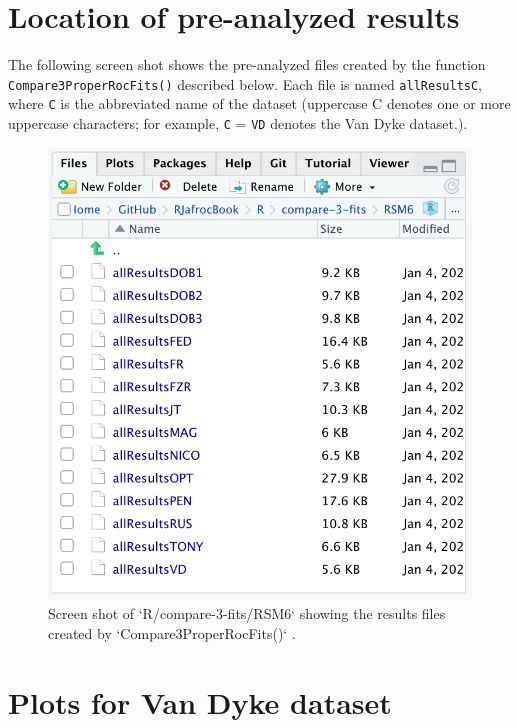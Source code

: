 \documentclass[
]{book}
\begin{document}
\hypertarget{rsm-3-fits-pre-analyzed-results}{%
\section{Location of pre-analyzed results}\label{rsm-3-fits-pre-analyzed-results}}

The following screen shot shows the pre-analyzed files created by the function \texttt{Compare3ProperRocFits()} described below. Each file is named \texttt{allResultsC}, where \texttt{C} is the abbreviated name of the dataset (uppercase C denotes one or more uppercase characters; for example, \texttt{C} = \texttt{VD} denotes the Van Dyke dataset.).

\begin{figure}

{\centering \includegraphics{images/compare-3-fits/RSM6} 

}

\caption{Screen shot of `R/compare-3-fits/RSM6` showing the results files created by  `Compare3ProperRocFits()` .}\label{fig:rsm-3-fits-all-results-rsm6}
\end{figure}

\hypertarget{rsm-3-fits-representative-plots-van-dyke}{%
\section{Plots for Van Dyke dataset}\label{rsm-3-fits-representative-plots-van-dyke}}
\end{document}
